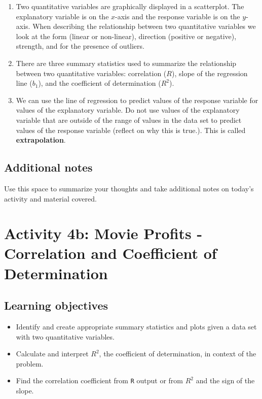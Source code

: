 \documentclass[
]{report}
\begin{document}
\begin{enumerate}
\def\labelenumi{\arabic{enumi}.}
\item
  Two quantitative variables are graphically displayed in a scatterplot. The explanatory variable is on the \(x\)-axis and the response variable is on the \(y\)-axis. When describing the relationship between two quantitative variables we look at the form (linear or non-linear), direction (positive or negative), strength, and for the presence of outliers.
\item
  There are three summary statistics used to summarize the relationship between two quantitative variables: correlation (\(R\)), slope of the regression line (\(b_1\)), and the coefficient of determination (\(R^2\)).
\item
  We can use the line of regression to predict values of the response variable for values of the explanatory variable. Do not use values of the explanatory variable that are outside of the range of values in the data set to predict values of the response variable (reflect on why this is true.). This is called \textbf{extrapolation}.
\end{enumerate}

\hypertarget{additional-notes-6}{%
\subsection{Additional notes}\label{additional-notes-6}}

Use this space to summarize your thoughts and take additional notes on today's activity and material covered.

\newpage

\hypertarget{activity-4b-movie-profits---correlation-and-coefficient-of-determination}{%
\section{Activity 4b: Movie Profits - Correlation and Coefficient of Determination}\label{activity-4b-movie-profits---correlation-and-coefficient-of-determination}}


\hypertarget{learning-objectives-3}{%
\subsection{Learning objectives}\label{learning-objectives-3}}

\begin{itemize}
\item
  Identify and create appropriate summary statistics and plots
  given a data set with two quantitative variables.
\item
  Calculate and interpret \(R^2\), the coefficient of determination, in context of the problem.
\item
  Find the correlation coefficient from \texttt{R} output or from \(R^2\) and the sign of the slope.
\end{itemize}
\end{document}
